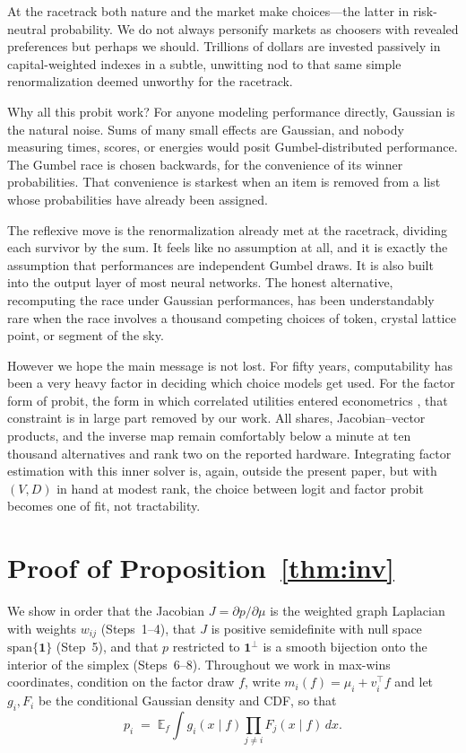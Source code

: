 \documentclass[12pt]{article}
\theoremstyle{remark}
\newcommand{\E}{\mathbb{E}}
\begin{document}
At the racetrack both nature and the market make choices---the latter in risk-neutral probability. We do not always personify markets as choosers with revealed preferences but perhaps we should. 
Trillions of dollars are invested passively in capital-weighted indexes in a subtle, unwitting nod to that same simple renormalization deemed unworthy for the racetrack.

Why all this probit work? For anyone modeling performance directly,
Gaussian is the natural noise. Sums of many small effects are Gaussian,
and nobody measuring times, scores, or energies would posit
Gumbel-distributed performance. The Gumbel race is chosen backwards,
for the convenience of its winner probabilities. That convenience is
starkest when an item is removed from a list whose probabilities have
already been assigned.

The reflexive move is the renormalization already met at the
racetrack, dividing each survivor by the sum. It
feels like no assumption at all, and it is exactly the assumption that
performances are independent Gumbel draws. It is also built into the
output layer of most neural networks. The honest alternative,
recomputing the race under Gaussian performances, has been
understandably rare when the race involves a thousand competing choices
of token, crystal lattice point, or segment of the sky.

However we hope the main message is not lost. For fifty years, computability has been a very heavy factor in deciding which choice models get used. For
the factor form of probit, the form in which correlated utilities entered
econometrics \citep{hausman1978}, that constraint is in large part removed by our work. All shares, Jacobian--vector products, and
the inverse map remain comfortably below a minute at ten thousand alternatives and
rank two on the reported hardware. Integrating
factor estimation with this inner solver is, again, outside the present paper,
but with $(V, D)$ in hand at modest rank, the choice between logit and
factor probit becomes one of fit, not tractability.

\appendix
\section{Proof of Proposition~\ref{thm:inv}}\label{app:inv}

We show in order that the Jacobian $J = \partial p/\partial\mu$ is the
weighted graph Laplacian with weights $w_{ij}$ (Steps~1--4), that $J$ is
positive semidefinite with null space $\mathrm{span}\{\mathbf{1}\}$
(Step~5), and that $p$ restricted to $\mathbf{1}^\perp$ is a smooth
bijection onto the interior of the simplex (Steps~6--8). Throughout we
work in max-wins coordinates, condition on the factor draw $f$, write
$m_i(f) = \mu_i + v_i^\top f$ and let $g_i, F_i$ be the conditional
Gaussian density and CDF, so that
\[
p_i \;=\; \E_f \int g_i(x\mid f)\prod_{j\ne i} F_j(x\mid f)\,dx .
\]
\end{document}

